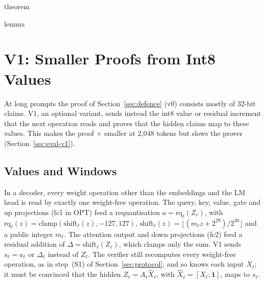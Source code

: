 \providecommand{\Kpre}{\mathsf{K}_{\mathrm{pre}}}
\providecommand{\sC}{\mathsf{C}}
\providecommand{\T}{\top}
\providecommand{\F}{\mathbb{F}_p}
\providecommand{\para}[1]{\par\noindent\textbf{#1}\quad}
\providecommand{\todo}[1]{\textbf{[TODO: #1]}}
\providecommand{\qed}{\hfill$\square$}
\providecommand{\Fext}{\mathbb{K}}
\providecommand{\Vlo}{\mathrm{lo}}
\providecommand{\Vshift}{\mathrm{shift}}
\providecommand{\Vrq}{\mathrm{rq}}
\providecommand{\Vtab}{\mathcal{T}}
\providecommand{\Vcut}{\mathcal{C}}
\providecommand{\Vclr}{\mathcal{O}}
\providecommand{\Nleaf}{N_{\mathrm{leaf}}}
\providecommand{\Veq}{\mathrm{eq}}
\ifcsname theorem\endcsname\else\newtheorem{theorem}{Theorem}\fi
\ifcsname lemma\endcsname\else\newtheorem{lemma}{Lemma}\fi

\section{V1: Smaller Proofs from Int8 Values}
\label{sec:v1}

At long prompts the proof of Section~\ref{sec:defence} (v0) consists mostly of 32-bit claims. V1, an optional variant, sends instead the int8 value or residual increment that the
next operation reads and proves that the hidden claims map to these values. This makes the proof
\VOneRatioRandom{}$\times$ smaller at 2{,}048 tokens but slows the prover (Section~\ref{sec:eval-v1}).

\subsection{Values and Windows}

In a decoder, every weight operation other than the embeddings and the LM head is read by exactly
one weight-free operation. The query, key, value, gate and up projections (fc1 in OPT) feed a
requantisation $a = \Vrq_\ell(Z_\ell)$, with $\Vrq_\ell(z) = \mathrm{clamp}(\Vshift_\ell(z), -127,
127)$, $\Vshift_\ell(z) = \lfloor (m_\ell z + 2^{29})/2^{30} \rfloor$ and a public integer
$m_\ell$. The attention output and down projections (fc2) feed a residual addition of $\Delta =
\Vshift_\ell(Z_\ell)$, which clamps only the sum. V1 sends $s_\ell = a_\ell$ or $\Delta_\ell$
instead of $Z_\ell$. The verifier still recomputes every weight-free operation, as in step~(S1) of
Section~\ref{sec:protocol}, and so knows each input $X_\ell$; it must be convinced that the hidden
$Z_\ell = A_\ell \hat X_\ell$, with $\hat X_\ell = [X_\ell; \mathbf 1]$, maps to $s_\ell$.

